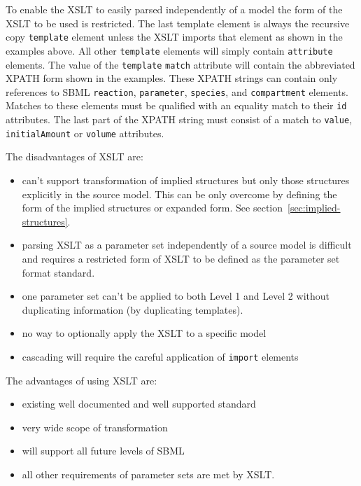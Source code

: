 \documentclass[10pt,twocolumntoc]{cekarticle}
\begin{document}
To enable the XSLT to easily parsed independently of a model the form of the XSLT to be used
is restricted.  The last template element is always the recursive copy \texttt{template}
element unless the XSLT imports that element as shown in the examples above.  All other
\texttt{template} elements will simply contain \texttt{attribute} elements.  The value
of the \texttt{template} \texttt{match} attribute will contain the abbreviated XPATH form
shown in the examples.  These XPATH strings can contain only references to SBML \texttt{reaction},
\texttt{parameter}, \texttt{species}, and \texttt{compartment} elements.  Matches to these elements
must be qualified with an equality match to their \texttt{id} attributes.  The last part of the XPATH
string must consist of a match to \texttt{value}, \texttt{initialAmount} or \texttt{volume} attributes.

The disadvantages of XSLT are:
\begin{itemize}

\item can't support transformation of implied structures but only those structures
explicitly in the source model.  This can be only overcome by defining the form of the
implied structures or expanded form.  See section~\ref{sec:implied-structures}.

\item parsing XSLT as a parameter set
independently of a source model is difficult and requires a restricted form of
XSLT to be defined as the parameter set format standard.  

\item one parameter set can't be applied to both Level 1 and Level 2 without duplicating
information (by duplicating templates).

\item no way to optionally apply the XSLT to a specific model
\item cascading will require the careful application of \texttt{import} elements

\end{itemize}

The advantages of using XSLT are:
\begin{itemize}
\item existing well documented and well supported standard
\item very wide scope of transformation
\item will support all future levels of SBML
\item all other requirements of parameter sets are met by XSLT.
\end{itemize}
\end{document}
